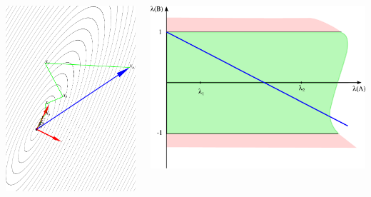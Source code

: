 \documentclass[professionalfonts,compress,unicode]{beamer}
\begin{document}
{
\begin{columns}
\begin{column}{0.5\textwidth}
\includegraphics[width=\columnwidth]{si0_35.pdf}%
\end{column}
\begin{column}{0.5\textwidth}
\includegraphics[width=\columnwidth]{lAlB0_35.pdf}%
\end{column}
\end{columns}
}
\end{document}
